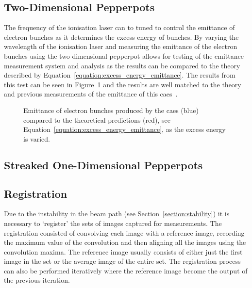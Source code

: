 \subsection{Two-Dimensional Pepperpots}
The frequency of the ionisation laser can to tuned to control the emittance of electron bunches as it determines the excess energy of bunches.
By varying the wavelength of the ionisation laser and measuring the emittance of the electron bunches using the two dimensional pepperpot allows for testing of the emittance measurement system and analysis as the results can be compared to the theory described by Equation~\ref{equation:excess_energy_emittance}.
The results from this test can be seen in Figure~\ref{figure:emittance_vs_theory} and the results are well matched to the theory and previous measurements of the emittance of this \gls{caes}~\cite{mcculloch_high-coherence_2013}.

\begin{figure}
    \center
    
    \caption{Emittance of electron bunches produced by the \gls{caes} (blue) compared to the theoretical predictions (red), see Equation~\ref{equation:excess_energy_emittance}, as the excess energy is varied.}
    \label{figure:emittance_vs_theory}
\end{figure}


\subsection{Streaked One-Dimensional Pepperpots}\label{section:streaked_pepperpot_results}

\subsection{Registration}\label{section:emittance_registration}
Due to the instability in the beam path (see Section~\ref{section:stability}) it is necessary to `register' the sets of images captured for measurements.
The registration consisted of convolving each image with a reference image, recording the maximum value of the convolution and then aligning all the images using the convolution maxima.
The reference image usually consists of either just the first image in the set or the average image of the entire set.
The registration process can also be performed iteratively where the reference image become the output of the previous iteration.

